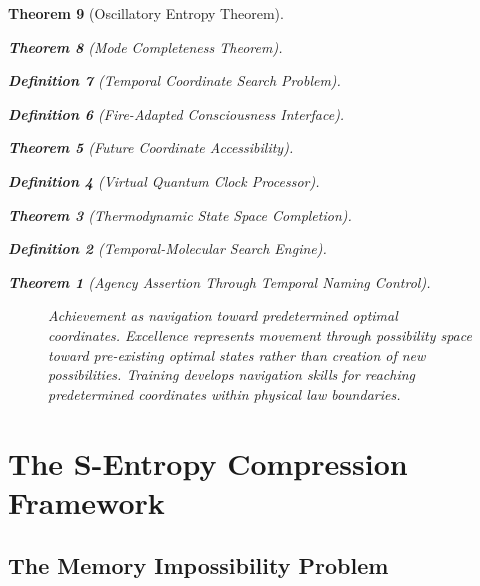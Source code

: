 \documentclass[12pt,a4paper]{article}
\newtheorem{theorem}{Theorem}[section]
\newtheorem{definition}[theorem]{Definition}
\begin{document}
\begin{theorem}[Oscillatory Entropy Theorem]
\begin{theorem}[Mode Completeness Theorem]
\begin{enumerate}
\begin{definition}[Temporal Coordinate Search Problem]
\begin{algorithm}
\begin{definition}[Fire-Adapted Consciousness Interface]
\begin{theorem}[Future Coordinate Accessibility]
\begin{definition}[Virtual Quantum Clock Processor]
\begin{itemize}
\begin{itemize}
\begin{theorem}[Thermodynamic State Space Completion]
\begin{definition}[Temporal-Molecular Search Engine]
\begin{theorem}[Agency Assertion Through Temporal Naming Control]
\begin{remark}
\begin{figure}[h]
\caption{Achievement as navigation toward predetermined optimal coordinates. Excellence represents movement through possibility space toward pre-existing optimal states rather than creation of new possibilities. Training develops navigation skills for reaching predetermined coordinates within physical law boundaries.}
\label{fig:achievement_navigation}
\end{figure}

\section{The S-Entropy Compression Framework}

\subsection{The Memory Impossibility Problem}


\end{remark}
\end{theorem}
\end{definition}
\end{theorem}
\end{itemize}
\end{itemize}
\end{definition}
\end{theorem}
\end{definition}
\end{algorithm}
\end{definition}
\end{enumerate}
\end{theorem}
\end{theorem}
\end{document}
